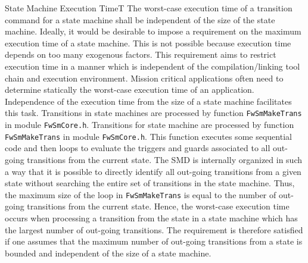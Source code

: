 \documentclass[a4paper,10pt]{article}
\newenvironment{fw_req_note}[7]
{\addtocounter{subsubsection}{1}
	\hspace{0.2cm}\textbf{FW-\arabic{section}.\arabic{subsection}.\arabic{subsubsection}/#2
	\hspace{0.8cm} #1}
	\vspace{-10pt}
\begin{longtable}{p{2.7cm}P{8.5cm}}
\hline
\textsc{Requirement} & #3 \\
\textsc{Note} & #4 \\
\textsc{Justification} & #5 \\
\textsc{Implementation} & #6  \\ 
\textsc{Verification} & #7  \\
\hline
}
{\end{longtable}}
\begin{document}
\begin{fw_req_note}{State Machine Execution Time}{T}
{The worst-case execution time of a transition command for a
state machine shall be independent of the size of the state machine.}
{Ideally, it would be desirable to impose a requirement on the 
maximum execution time of a state machine. 
This is not possible because execution time depends on too many exogenous factors. 
This requirement aims to restrict execution time in a manner which is 
independent of the compilation/linking tool chain and execution environment.}
{Mission critical applications often need to determine 
statically the worst-case execution time of an application. 
Independence of the execution time from the size of a state machine facilitates this task.}
{Transitions in state machines are processed by function 
\texttt{FwSmMakeTrans} in module \texttt{FwSmCore.h}.} 
{Transitions for state machine are processed by function 
\texttt{FwSmMakeTrans} in module \texttt{FwSmCore.h}. 
This function executes some sequential code and then loops to evaluate the triggers 
and guards associated to all out-going transitions from the current state. 
The SMD is internally organized in such a way that it is possible to directly identify 
all out-going transitions from a given state without searching the entire set of transitions 
in the state machine. 
Thus, the maximum size of the loop in \texttt{FwSmMakeTrans} is equal to the number of out-going 
transitions from the current state. Hence, the worst-case execution time occurs when processing 
a transition from the state in a state machine which has the largest number of out-going transitions. 
The requirement is therefore satisfied if one assumes that the maximum number of out-going 
transitions from a state is bounded and independent of the size of a state machine.}
\end{fw_req_note}
\end{document}
